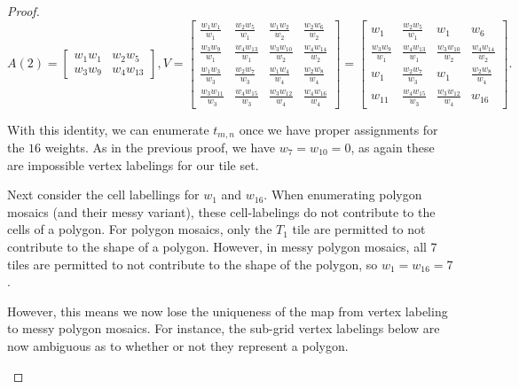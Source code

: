\documentclass[12pt]{article}
\theoremstyle{plain}
\theoremstyle{definition}
\theoremstyle{remark}
\theoremstyle{definition}
\newcommand{\cell}[4]{ \draw[thick] ( #1 , #2 ) rectangle ( #3 , #4 );}
\begin{document}
\begin{proof}
$$
A(2) = 
\begin{bmatrix}
    w_{1}w_{1} & w_{2} w_{5} \\
    w_{3} w_{9} & w_{4} w_{13}
\end{bmatrix},
V = 
\begin{bmatrix}
    \frac{w_{1} w_{1}}{w_{1}} & \frac{w_{2} w_{5}}{w_{1}} & \frac{w_{1} w_{2}}{w_{2}} & \frac{w_{2} w_{6}}{w_{2}} \\
    \frac{w_{3} w_{9}}{w_{1}} & \frac{w_{4} w_{13}}{w_{1}} & \frac{w_{3} w_{10}}{w_{2}} & \frac{w_{4} w_{14}}{w_{2}} \\
    \frac{w_{1} w_{3}}{w_{3}} & \frac{w_{2} w_{7}}{w_{3}} & \frac{w_{1} w_{4}}{w_{4}} & \frac{w_{2} w_{8}}{w_{4}} \\
    \frac{w_{3} w_{11}}{w_{3}} & \frac{w_{4} w_{15}}{w_{3}} & \frac{w_{3} w_{12}}{w_{4}} & \frac{w_{4} w_{16}}{w_{4}}
\end{bmatrix}
= 
\begin{bmatrix}
    w_{1} & \frac{w_{2} w_{5}}{w_{1}} & w_{1} & w_{6} \\
    \frac{w_{3} w_{9}}{w_{1}} & \frac{w_{4} w_{13}}{w_{1}} & \frac{w_{3} w_{10}}{w_{2}} & \frac{w_{4} w_{14}}{w_{2}} \\
    w_{1} & \frac{w_{2} w_{7}}{w_{3}} & w_{1} & \frac{w_{2} w_{8}}{w_{4}} \\
    w_{11} & \frac{w_{4} w_{15}}{w_{3}} & \frac{w_{3} w_{12}}{w_{4}} & w_{16}
\end{bmatrix}.
$$

With this identity, we can enumerate $t_{m,n}$ once we have proper assignments for the $16$ weights. As in the previous proof, we have $w_{7}=w_{10}=0$, as again these are impossible vertex labelings for our tile set. 

Next consider the cell labellings for $w_{1}$ and $w_{16}$. When enumerating polygon mosaics (and their messy variant), these cell-labelings do not contribute to the cells of a polygon. For polygon mosaics, only the $T_1$ tile are permitted to not contribute to the shape of a polygon. However, in messy polygon mosaics, all $7$ tiles are permitted to not contribute to the shape of the polygon, so $w_{1} = w_{16}=7$.

However, this means we now lose the uniqueness of the map from vertex labeling to messy polygon mosaics. For instance, the sub-grid vertex labelings below are now ambiguous as to whether or not they represent a polygon.

\begin{center}
\end{center}
\end{proof}
\end{document}
